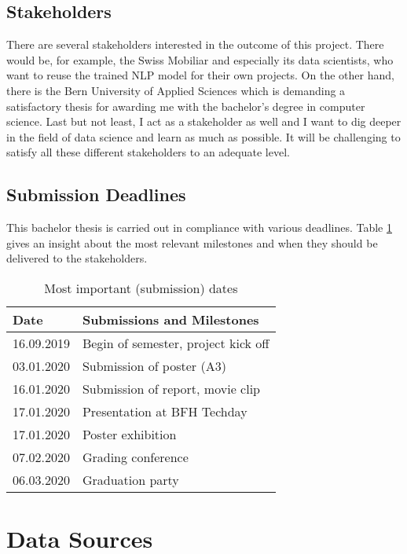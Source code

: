 \subsection{Stakeholders}

There are several stakeholders interested in the outcome of this project. There would be, for example, the Swiss Mobiliar and
especially its data scientists, who want to reuse the trained NLP model for their own projects. On the other hand, there is
the Bern University of Applied Sciences which is demanding a satisfactory thesis for awarding me with the bachelor's degree
in computer science. Last but not least, I act as a stakeholder as well and I want to dig deeper in the field of data science and
learn as much as possible. It will be challenging to satisfy all these different stakeholders to an adequate level.

\subsection{Submission Deadlines}

This bachelor thesis is carried out in compliance with various deadlines. Table \ref{tbl:deadlines} gives an insight about the most
relevant milestones and when they should be delivered to the stakeholders.

\begin{table}[ht!]
    \centering
    \begin{tabular}{|l|l|}
        \hline
        \textbf{Date} & \textbf{Submissions and Milestones} \\ [0.5ex]
        \hline
        16.09.2019 & Begin of semester, project kick off \\
        03.01.2020 & Submission of poster (A3) \\
        16.01.2020 & Submission of report, movie clip \\
        17.01.2020 & Presentation at BFH Techday \\
        17.01.2020 & Poster exhibition \\
        07.02.2020 & Grading conference \\
        06.03.2020 & Graduation party \\ [1ex]
        \hline
    \end{tabular}
    \caption{Most important (submission) dates}
    \label{tbl:deadlines}
\end{table}

\section{Data Sources}

